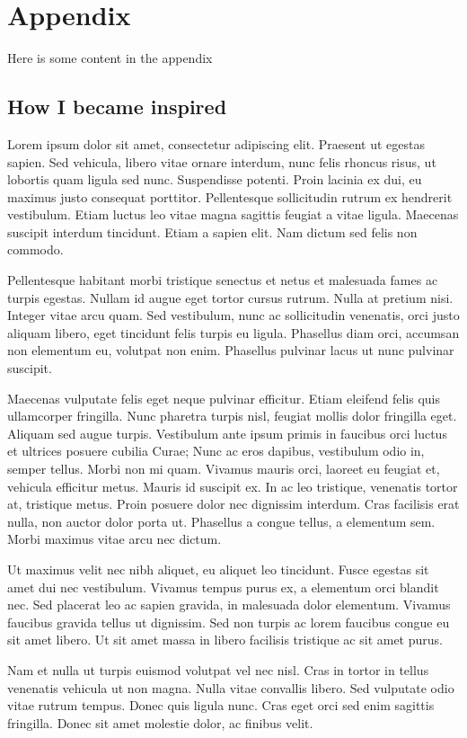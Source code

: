 \documentclass[runningheads,a4paper]{llncs}
\begin{document}
\section{Appendix}
Here is some content in the appendix

\begin{subappendices}
\subsection{How I became inspired}
Lorem ipsum dolor sit amet, consectetur adipiscing elit. Praesent ut egestas sapien. Sed vehicula, libero vitae ornare interdum, nunc felis rhoncus risus, ut lobortis quam ligula sed nunc. Suspendisse potenti. Proin lacinia ex dui, eu maximus justo consequat porttitor. Pellentesque sollicitudin rutrum ex hendrerit vestibulum. Etiam luctus leo vitae magna sagittis feugiat a vitae ligula. Maecenas suscipit interdum tincidunt. Etiam a sapien elit. Nam dictum sed felis non commodo.

Pellentesque habitant morbi tristique senectus et netus et malesuada fames ac turpis egestas. Nullam id augue eget tortor cursus rutrum. Nulla at pretium nisi. Integer vitae arcu quam. Sed vestibulum, nunc ac sollicitudin venenatis, orci justo aliquam libero, eget tincidunt felis turpis eu ligula. Phasellus diam orci, accumsan non elementum eu, volutpat non enim. Phasellus pulvinar lacus ut nunc pulvinar suscipit.

Maecenas vulputate felis eget neque pulvinar efficitur. Etiam eleifend felis quis ullamcorper fringilla. Nunc pharetra turpis nisl, feugiat mollis dolor fringilla eget. Aliquam sed augue turpis. Vestibulum ante ipsum primis in faucibus orci luctus et ultrices posuere cubilia Curae; Nunc ac eros dapibus, vestibulum odio in, semper tellus. Morbi non mi quam. Vivamus mauris orci, laoreet eu feugiat et, vehicula efficitur metus. Mauris id suscipit ex. In ac leo tristique, venenatis tortor at, tristique metus. Proin posuere dolor nec dignissim interdum. Cras facilisis erat nulla, non auctor dolor porta ut. Phasellus a congue tellus, a elementum sem. Morbi maximus vitae arcu nec dictum.

Ut maximus velit nec nibh aliquet, eu aliquet leo tincidunt. Fusce egestas sit amet dui nec vestibulum. Vivamus tempus purus ex, a elementum orci blandit nec. Sed placerat leo ac sapien gravida, in malesuada dolor elementum. Vivamus faucibus gravida tellus ut dignissim. Sed non turpis ac lorem faucibus congue eu sit amet libero. Ut sit amet massa in libero facilisis tristique ac sit amet purus.

Nam et nulla ut turpis euismod volutpat vel nec nisl. Cras in tortor in tellus venenatis vehicula ut non magna. Nulla vitae convallis libero. Sed vulputate odio vitae rutrum tempus. Donec quis ligula nunc. Cras eget orci sed enim sagittis fringilla. Donec sit amet molestie dolor, ac finibus velit.
%
\end{subappendices}
\end{document}
